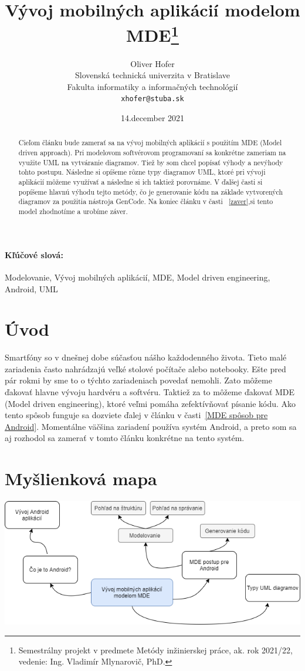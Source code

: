 \documentclass[10pt,twoside,slovak,a4paper]{article}
\title{Vývoj mobilných aplikácií modelom MDE\thanks{Semestrálny projekt v predmete Metódy inžinierskej práce, ak. rok 2021/22, vedenie: Ing. Vladimír Mlynarovič, PhD.}} %
\author{Oliver Hofer\\[2pt]
	{\small Slovenská technická univerzita v Bratislave}\\
	{\small Fakulta informatiky a informačných technológií}\\
	{\small \texttt{xhofer@stuba.sk}}
	}
\date{\small 14.december  2021} %
\begin{document}
\maketitle

\begin{abstract}
Cieľom článku bude zamerať sa na vývoj mobilných aplikácií s použitím MDE (Model driven approach). Pri modelovom softvérovom programovaní sa konkrétne zameriam na využite UML na vytváranie diagramov. Tiež by som chcel popísať výhody a nevýhody tohto postupu. Následne si opíšeme rôzne typy diagramov UML, ktoré pri vývoji aplikácií môžeme využívať a následne si ich taktiež porovnáme. V ďalšej časti si popíšeme hlavnú výhodu tejto metódy, čo je generovanie kódu na základe vytvorených diagramov za použitia nástroja GenCode. Na koniec článku v časti ~\ref{zaver},si tento model zhodnotíme a urobíme záver.
\end{abstract}
\paragraph{Kľúčové slová:} Modelovanie, Vývoj mobilných aplikácií, MDE, Model driven engineering, Android, UML


\section{Úvod}
\cite{2012}
Smartfóny so v dnešnej dobe súčasťou nášho každodenného života. Tieto malé zariadenia často nahrádzajú veľké stolové počítače alebo notebooky. Ešte pred pár rokmi by sme to o týchto zariadeniach povedať nemohli. Zato môžeme ďakovať hlavne vývoju hardvéru a softvéru. \newline
Taktiež za to môžeme ďakovať MDE (Model driven engineering), ktoré veľmi pomáha zefektívňovať písanie kódu. Ako tento spôsob funguje sa dozviete ďalej v článku v časti~\ref{MDE spôsob pre Android}.\newline
Momentálne väčšina zariadení používa systém Android, a preto som sa aj rozhodol sa zamerať v tomto článku konkrétne na tento systém.

\newpage
\section{Myšlienková mapa} \label{Myšlienková mapa}


\includegraphics[scale=0.65]{myšlienková mapa.png}
\end{document}
